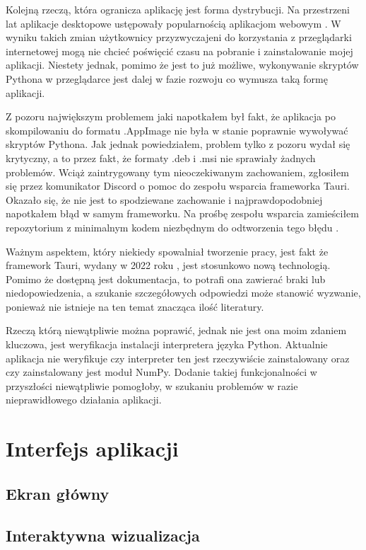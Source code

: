 \documentclass{SGGW-thesis}
\begin{document}
	Kolejną rzeczą, która ogranicza aplikację jest forma dystrybucji. Na przestrzeni lat aplikacje desktopowe ustępowały popularnością aplikacjom webowym \cite{web-vs-desktop}. W wyniku takich zmian użytkownicy przyzwyczajeni do korzystania z przeglądarki internetowej mogą nie chcieć poświęcić czasu na pobranie i zainstalowanie mojej aplikacji. Niestety jednak, pomimo że jest to już możliwe, wykonywanie skryptów Pythona w przeglądarce jest dalej w fazie rozwoju \cite{python-webassembly} co wymusza taką formę aplikacji.
	
	Z pozoru największym problemem jaki napotkałem był fakt, że aplikacja po skompilowaniu do formatu .AppImage nie była w stanie poprawnie wywoływać skryptów Pythona. Jak jednak powiedziałem, problem tylko z pozoru wydał się krytyczny, a to przez fakt, że formaty .deb i .msi nie sprawiały żadnych problemów. Wciąż zaintrygowany tym nieoczekiwanym zachowaniem, zgłosiłem się przez komunikator Discord o pomoc do zespołu wsparcia frameworka Tauri. Okazało się, że nie jest to spodziewane zachowanie i najprawdopodobniej napotkałem błąd w samym frameworku. Na prośbę zespołu wsparcia zamieściłem repozytorium z minimalnym kodem niezbędnym do odtworzenia tego błędu \cite{app-error-repo}.
	
	Ważnym aspektem, który niekiedy spowalniał tworzenie pracy, jest fakt że framework Tauri, wydany w 2022 roku \cite{tauri-release}, jest stosunkowo nową technologią. Pomimo że dostępną jest dokumentacja, to potrafi ona zawierać braki lub niedopowiedzenia, a szukanie szczegółowych odpowiedzi może stanowić wyzwanie, ponieważ nie istnieje na ten temat znacząca ilość literatury.
	
	Rzeczą którą niewątpliwie można poprawić, jednak nie jest ona moim zdaniem kluczowa, jest weryfikacja instalacji interpretera języka Python. Aktualnie aplikacja nie weryfikuje czy interpreter ten jest rzeczywiście zainstalowany oraz czy zainstalowany jest moduł NumPy. Dodanie takiej funkcjonalności w przyszłości niewątpliwie pomogłoby, w szukaniu problemów w razie nieprawidłowego działania aplikacji.
	

\chapter{Interfejs aplikacji}
	\section{Ekran główny}
	\section{Interaktywna wizualizacja}
\end{document}
